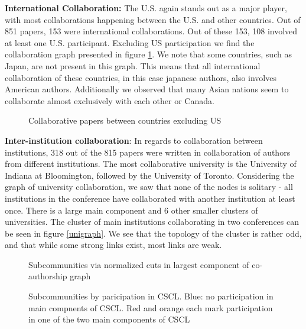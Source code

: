 \documentclass[article,twocolumn]{IEEEtran}
\begin{document}
\textbf{International Collaboration:} The U.S. again stands out as a
major player, with most collaborations happening between the U.S. and
other countries. Out of 851 papers, 153 were international
collaborations. Out of these 153, 108 involved at least one U.S.
participant. Excluding US participation we find the collaboration graph
presented in figure \ref{figcollab}. We note that some countries, such
as Japan, are not present in this graph. This means that all
international collaboration of these countries, in this case japanese
authors, also involves American authors. Additionally we observed that
many Asian nations seem to collaborate almost exclusively with each
other or Canada.


    \begin{figure}
        \begin{center}\end{center}
        \caption{Collaborative papers between countries excluding US}
        \label{figcollab}
    \end{figure}
    
    \textbf{Inter-institution collaboration}: In regards to collaboration
between institutions, 318 out of the 815 papers were written in
collaboration of authors from different institutions. The most
collaborative university is the University of Indiana at Bloomington,
followed by the University of Toronto. Considering the graph of
university collaboration, we saw that none of the nodes is solitary -
all institutions in the conference have collaborated with another
institution at least once. There is a large main component and 6 other
smaller clusters of universities. The cluster of main institutions
collaborating in two conferences can be seen in figure \ref{unigraph}.
We see that the topology of the cluster is rather odd, and that while
some strong links exist, most links are weak.


    \begin{figure}
        \begin{center}\end{center}
        \caption{Subcommunities via normalized cuts in largest component of co-authorship graph}
        \label{normalized}
    \end{figure}
    

    \begin{figure}
        \begin{center}\end{center}
        \caption{Subcommunities by paricipation in CSCL. Blue: no participation in main compnents of CSCL. Red and orange each mark participation in one of the two main components of CSCL}
        \label{CSCL_components}
    \end{figure}
    
\end{document}
